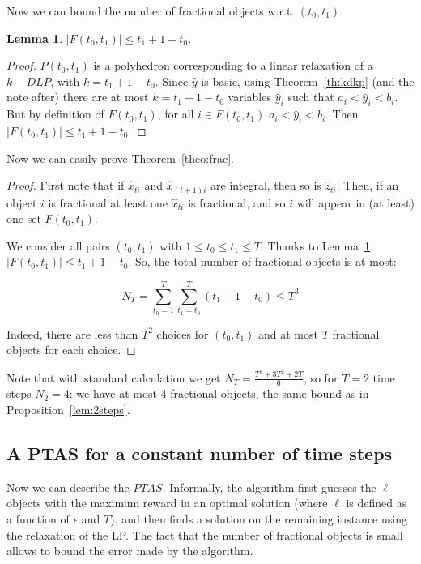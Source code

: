 \documentclass[a4paper]{book}
\newtheorem{lemma}{Lemma}[chapter]
\newtheorem{proof}{\noindent{\bf Proof.} }
\begin{document}
Now we can bound the number of fractional objects w.r.t. $(t_0,t_1)$.

\begin{lemma}\label{lem:frac}
$|F(t_0,t_1)|\leq t_1+1-t_0$.
\end{lemma}
\begin{proof}
$P(t_0,t_1)$ is a polyhedron corresponding to a linear relaxation of a $k-DLP$, with $k=t_1+1-t_0$. Since $\hat{y}$ is basic, using Theorem~\ref{th:kdkp} (and the note after) there are at most $k=t_1+1-t_0$ variables  $\hat{y}_i$ such that  $a_i<\hat{y}_i<b_i$. But by definition of  $F(t_0,t_1)$, for all $i\in F(t_0,t_1)$ $a_i<\hat{y}_i<b_i$. Then $|F(t_0,t_1)|\leq  t_1+1-t_0$.
\end{proof}

Now we can easily prove Theorem~\ref{theo:frac}.

\begin{proof}
First note that if $\hat{x}_{ti}$ and $\hat{x}_{(t+1)i}$ are integral, then so is $\hat{z}_{ti}$. Then, if an object $i$ is fractional at least one $\hat{x}_{ti}$ is fractional, and so $i$ will appear in (at least) one set $F(t_0,t_1)$. 

We consider all pairs $(t_0,t_1)$ with $1\leq t_0\leq t_1 \leq T$. Thanks to Lemma~\ref{lem:frac}, $|F(t_0,t_1)|\leq t_1+1-t_0$. So, the total number of fractional objects is at most:

$$N_T=\sum_{t_0=1}^{T}\sum_{t_1=t_0}^T(t_1+1-t_0) \leq T^3$$

Indeed, there are less than $T^2$ choices for $(t_0,t_1)$ and at most $T$ fractional objects for each choice. 
\end{proof}

Note that with standard calculation we get $N_T=\frac{T^3+3T^2+2T}{6}$, so for $T=2$ time steps $N_2=4$: we have at most 4 fractional objects, the same bound as in Proposition~\ref{lem:2steps}.



\subsection{A PTAS for a constant number of time steps}\label{sec:constant}


Now we can describe the $PTAS$. Informally, the algorithm first guesses the $\ell$ objects with the maximum reward in an optimal solution (where $\ell$ is defined as a function of $\epsilon$ and $T$), and then finds a solution on the remaining instance using the relaxation of the LP. The fact that the number of fractional objects is small allows to bound the error made by the algorithm. 
\end{document}
